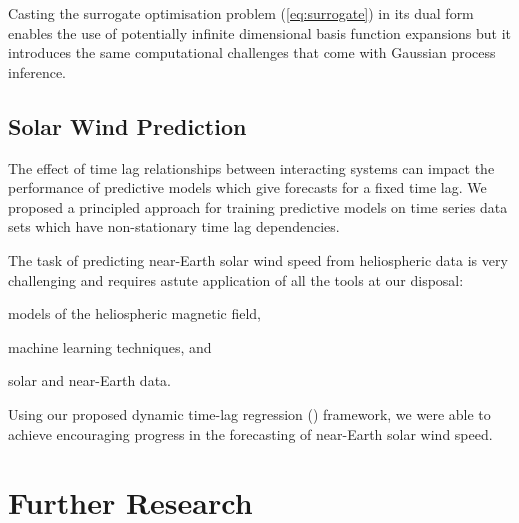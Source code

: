 Casting the surrogate optimisation problem (\cref{eq:surrogate}) in its dual 
form enables the use of potentially infinite dimensional basis function 
expansions but it introduces the same computational challenges that come with 
Gaussian process inference. 

\subsection*{Solar Wind Prediction}

The effect of time lag relationships between interacting systems can impact the 
performance of predictive models which give forecasts for a fixed time lag. We 
proposed a principled approach for training predictive models on time series 
data sets which have non-stationary time lag dependencies.

The task of predicting near-Earth solar wind speed from heliospheric data is 
very challenging and requires astute application of all the tools at our 
disposal: 
\begin{enumerate*} 
    \item models of the heliospheric magnetic field,
    \item machine learning techniques, and 
    \item solar and near-Earth data. 
\end{enumerate*}
Using our proposed dynamic time-lag regression (\XX) framework, we were able to 
achieve encouraging progress in the forecasting of near-Earth solar wind speed.


\section{Further Research}

